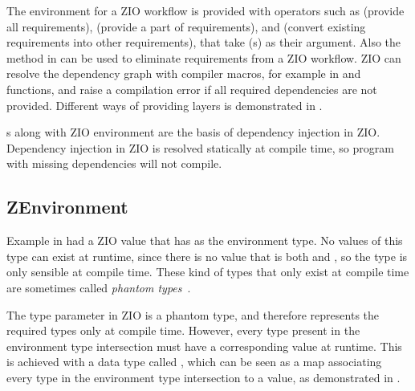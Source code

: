 

The environment for a ZIO workflow is provided with operators such as  (provide all requirements),  (provide a part of requirements), and  (convert existing requirements into other requirements), that take (s) as their argument. Also the  method in  can be used to eliminate requirements from a ZIO workflow. ZIO can resolve the dependency graph with compiler macros, for example in  and  functions, and raise a compilation error if all required dependencies are not provided. Different ways of providing layers is demonstrated in .



 s along with ZIO environment are the basis of dependency injection in ZIO. Dependency injection in ZIO is resolved statically at compile time, so program with missing dependencies will not compile.


\subsection{ZEnvironment}
Example in  had a ZIO value  that has  as the environment type. No values of this type can exist at runtime, since there is no value that is both  and , so the type is only sensible at compile time. These kind of types that only exist at compile time are sometimes called \textit{phantom types}~\cite{fun-phantom-types}.

The  type parameter in ZIO is a phantom type, and therefore represents the required types only at compile time. However, every type present in the environment type intersection must have a corresponding value at runtime. This is achieved with a data type called , which can be seen as a map associating every type in the environment type intersection to a value, as demonstrated in .

